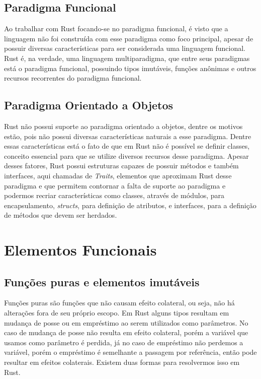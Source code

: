\documentclass[rel_mlp]{iiufrgs}
\begin{document}
\section{Paradigma Funcional}
Ao trabalhar com Rust focando-se no paradigma funcional, é visto que a linguagem não foi construída com esse paradigma como foco principal, apesar de possuir diversas características para ser considerada uma linguagem funcional. Rust é, na verdade, uma linguagem multiparadigma, que entre seus paradigmas está o paradigma funcional, possuindo tipos imutáveis, funções anônimas e outros recursos recorrentes do paradigma funcional.


\section{Paradigma Orientado a Objetos}
 Rust não possui suporte ao paradigma orientado a objetos, dentre os motivos estão, pois não possui diversas características naturais a esse paradigma. Dentre essas características está o fato de que em Rust não é possível se definir classes, conceito essencial para que se utilize diversos recursos desse paradigma. Apesar desses fatores, Rust possui estruturas capazes de possuir métodos e também interfaces, aqui chamadas de \textit{Traits}, elementos que aproximam Rust desse paradigma e que permitem contornar a falta de suporte ao paradigma e podermos recriar características como classes, através de módulos, para encapsulamento, \textit{structs}, para definição de atributos, e interfaces, para a definição de métodos que devem ser herdados.

%
\chapter{Elementos Funcionais}

\section{Funções puras e elementos imutáveis}
Funções puras são funções que não causam efeito colateral, ou seja, não há alterações fora de seu próprio escopo. Em Rust alguns tipos resultam em mudança de posse ou em empréstimo ao serem utilizados como parâmetros. No caso de mudança de posse não resulta em efeito colateral, porém a variável que usamos como parâmetro é perdida, já no caso de empréstimo não perdemos a variável, porém o empréstimo é semelhante a passagem por referência, então pode resultar em efeitos colaterais. Existem duas formas para resolvermos isso em Rust.
\end{document}
